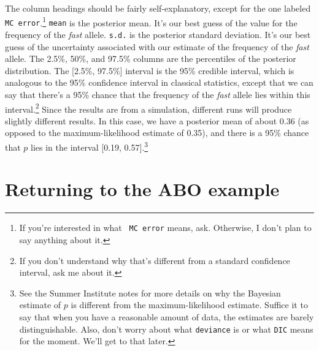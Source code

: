 \documentclass[12pt]{article}
\begin{document}
The column headings should be fairly self-explanatory, except for the
one labeled {\tt MC error}.\footnote{If you're interested in what {\tt
    MC error} means, ask. Otherwise, I don't plan to say anything
  about it.} {\tt mean} is the posterior mean. It's our best guess of
the value for the frequency of the {\it fast\/} allele. {\tt s.d.} is
the posterior standard deviation. It's our best guess of the
uncertainty associated with our estimate of the frequency of the {\it
  fast\/} allele. The 2.5\%, 50\%, and 97.5\% columns are the
percentiles of the posterior distribution. The [2.5\%, 97.5\%]
interval is the 95\% credible interval, which is analogous to the 95\%
confidence interval in classical statistics, except that we can say
that there's a 95\% chance that the frequency of the {\it fast\/}
allele lies within this interval.\footnote{If you don't understand why
  that's different from a standard confidence interval, ask me about
  it.} Since the results are from a simulation, different runs will
produce slightly different results. In this case, we have a posterior
mean of about 0.36 (as opposed to the maximum-likelihood estimate of
0.35), and there is a 95\% chance that $p$ lies in the interval [0.19,
0.57].\footnote{See the Summer Institute notes for more details on why
  the Bayesian estimate of $p$ is different from the
  maximum-likelihood estimate. Suffice it to say that when you have a
  reasonable amount of data, the estimates are barely
  distinguishable. Also, don't worry about what {\tt deviance\/} is or
what {\tt DIC\/} means for the moment. We'll get to that later.}

\section*{Returning to the ABO example}
\end{document}
